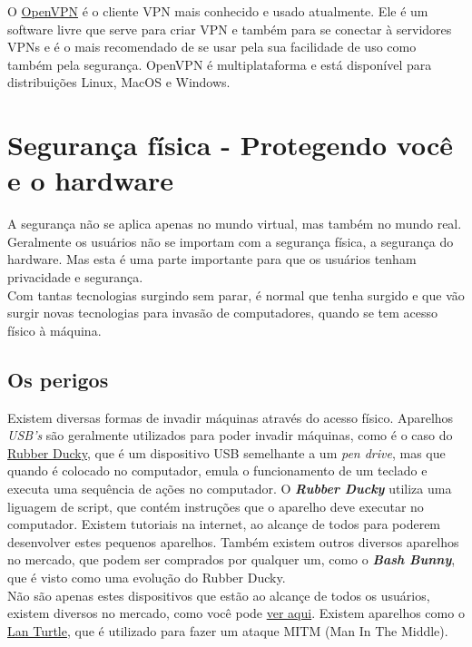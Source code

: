\documentclass[12pt, letterpaper, Monospace:12]{report}
\begin{document}
O \href{https://openvpn.org/}{OpenVPN} é o cliente VPN mais conhecido e usado atualmente. Ele é um software livre que serve para criar VPN e também para se conectar à servidores VPNs e é o mais recomendado de se usar pela sua facilidade de uso como também pela segurança. OpenVPN é multiplataforma e está disponível para distribuições Linux, MacOS e Windows.

\pagebreak

\section{Segurança física - Protegendo você e o hardware}
	A segurança não se aplica apenas no mundo virtual, mas também no mundo real. Geralmente os usuários não se importam com a segurança física, a segurança do hardware. Mas esta é uma parte importante para que os usuários tenham privacidade e segurança.\\

	Com tantas tecnologias surgindo sem parar, é normal que tenha surgido e que vão surgir novas tecnologias para invasão de computadores, quando se tem acesso físico à máquina.
	\subsection{Os perigos}
	Existem diversas formas de invadir máquinas através do acesso físico. Aparelhos \textit{USB's} são geralmente utilizados para poder invadir máquinas, como é o caso do \href{https://pt.wikipedia.org/wiki/Rubber_Ducky}{Rubber Ducky}, que é um dispositivo USB semelhante a um \textit{pen drive}, mas que quando é colocado no computador, emula o funcionamento de um teclado e executa uma sequência de ações no computador. O \textit{\textbf{Rubber Ducky}} utiliza uma liguagem de script, que contém instruções que o aparelho deve executar no computador. Existem tutoriais na internet, ao alcançe de todos para poderem desenvolver estes pequenos aparelhos. Também existem outros diversos aparelhos no mercado, que podem ser comprados por qualquer um, como o \textit{\textbf{Bash Bunny}}, que é visto como uma evolução do Rubber Ducky.\\

	Não são apenas estes dispositivos que estão ao alcançe de todos os usuários, existem diversos no mercado, como você pode \href{https://hakshop.com/}{ver aqui}. Existem aparelhos como o \href{https://hakshop.com/products/lan-turtle}{Lan Turtle}, que é utilizado para fazer um ataque MITM (Man In The Middle).\\
\end{document}

